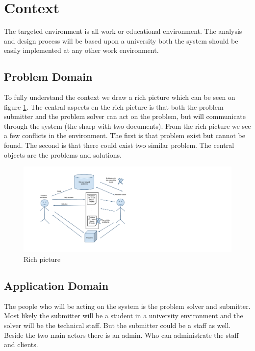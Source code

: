 \section{Context}
The targeted environment is all work or educational environment. The analysis and design process will be based upon a university both the system should be easily implemented at any other work environment. 

\subsection{Problem Domain}
To fully understand the context we draw a rich picture which can be seen on figure \ref{fig:rich_picture}. 
The central aspects en the rich picture is that both the problem submitter and the problem solver can act on the problem, but will communicate through the system (the sharp with two documents). 
From the rich picture we see a few conflicts in the environment. 
The first is that problem exist but cannot be found. The second is that there could exist two similar problem. The central objects are the problems and solutions. 

\begin{figure}%
\includegraphics{input/background/rich_picture.pdf}%
\caption{Rich picture}%
\label{fig:rich_picture}%
\end{figure}

\subsection{Application Domain}
The people who will be acting on the system is the problem solver and submitter. Most likely the submitter will be a student in a university environment and the solver will be the technical staff. But the submitter could be a staff as well. Beside the two main actors there is an admin. Who can administrate the staff and clients. 